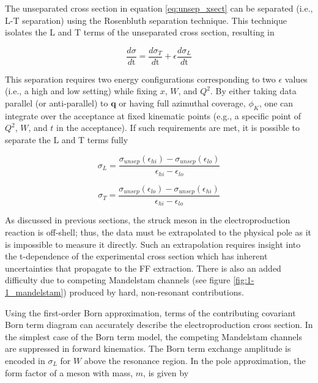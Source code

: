 \documentclass[
]{report}
\begin{document}
The unseparated cross section in equation \ref{eq:unsep_xsect} can be
separated (i.e., L-T separation) using the Rosenbluth separation
technique. This technique isolates the L and T terms of the unseparated
cross section, resulting in

\begin{equation} 
    \frac{d\sigma}{d\mathrm{t}}=\frac{d\sigma_T}{d\mathrm{t}}+\epsilon\frac{d\sigma_L}{d\mathrm{t}}
  \label{eq:lt_unsep_xsect} 
\end{equation}

This separation requires two energy configurations corresponding to two
\(\epsilon\) values (i.e., a high and low setting) while fixing \(x\),
\(W\), and \(Q^2\). By either taking data parallel (or anti-parallel) to
\(\mathbf{q}\) or having full azimuthal coverage, \(\phi_{K}\), one can
integrate over the acceptance at fixed kinematic points (e.g., a
specific point of \(Q^2\), \(W\), and \(t\) in the acceptance). If such
requirements are met, it is possible to separate the L and T terms fully

\begin{equation}
\sigma_L=\frac{\sigma_{unsep}(\epsilon_{hi})-\sigma_{unsep}(\epsilon_{lo})}{\epsilon_{hi}-\epsilon_{lo}}
  \label{eq:sep_l} 
\end{equation}

\begin{equation}
\sigma_T=\frac{\sigma_{unsep}(\epsilon_{lo})-\sigma_{unsep}(\epsilon_{hi})}{\epsilon_{hi}-\epsilon_{lo}}
  \label{eq:sep_t} 
\end{equation}

\label{Chapter-1-3}

As discussed in previous sections, the struck meson in the
electroproduction reaction is off-shell; thus, the data must be
extrapolated to the physical pole as it is impossible to measure it
directly. Such an extrapolation requires insight into the t-dependence
of the experimental cross section which has inherent uncertainties that
propagate to the FF extraction. There is also an added difficulty due to
competing Mandelstam channels (see figure \ref{fig:1-1_mandelstam})
produced by hard, non-resonant contributions.



Using the first-order Born approximation, terms of the contributing
covariant Born term diagram can accurately describe the
electroproduction cross section. In the simplest case of the Born term
model, the competing Mandelstam channels are suppressed in forward
kinematics. The Born term exchange amplitude is encoded in \(\sigma_L\)
for \(W\) above the resonance region. In the pole approximation, the
form factor of a meson with mass, \(m\), is given by
\end{document}
